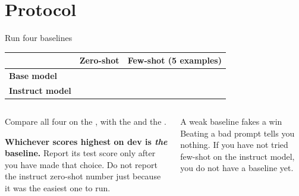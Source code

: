 \documentclass[aspectratio=169,10pt]{beamer}
\begin{document}
\section{Protocol}

\begin{frame}{Run four baselines}
  \centering
  \begin{tabular}{@{}l C{3.0cm} C{3.0cm}@{}}
    \toprule
    & \textbf{Zero-shot} & \textbf{Few-shot (5 examples)}\\
    \midrule
    \textbf{Base model} & & \\[0.6em]
    \textbf{Instruct model} & & \\
    \bottomrule
  \end{tabular}
  \vspace{0.9em}

  \begin{columns}[T]
    \begin{column}{0.52\textwidth}
      Compare all four on the , with the  and the .
      \vspace{0.4em}

      \textbf{Whichever scores highest on dev is \emph{the} baseline.} Report
      its test score only after you have made that choice.
      Do not report the instruct zero-shot number just because it was the
      easiest one to run.
    \end{column}
    \begin{column}{0.48\textwidth}
      \begin{block}{A weak baseline fakes a win}
        \small
        Beating a bad prompt tells you nothing. If you have not tried few-shot
        on the instruct model, you do not have a baseline yet.
      \end{block}
    \end{column}
  \end{columns}
\end{frame}
\end{document}
